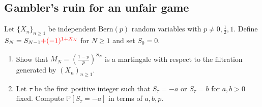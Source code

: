 \documentclass[12pt,reqno]{amsart}
\theoremstyle{definition}
\theoremstyle{remark}
\numberwithin{equation}{section}
\begin{document}
\subsection{Gambler's ruin for an unfair game}\label{subsection:gambler}
Let $\{X_{n}\}_{n\geq1}$ be independent $\mathrm{Bern}(p)$ random variables with $p\neq0,\frac12,1$. Define $S_{N}=S_{N-1}{\color{red}+(-1)^{1+X_{N}}}$ for $N\geq1$ and set $S_{0}=0$. 
\begin{enumerate}
\item Show that $M_{N}=\left(\frac{1-p}{p}\right)^{S_{N}}$ is a martingale with respect to the filtration generated by $(X_{n})_{n\geq1}$.
\item Let $\tau$ be the first positive integer such that $S_{\tau}=-a$ or $S_{\tau}=b$ for $a,b>0$ fixed. Compute $\mathbb{P}[S_{\tau}=-a]$ in terms of $a,b,p$.
\end{enumerate}
\begin{comment}
\subsection{Trigonometry is very important for studying stochastic processes}
Keep the notation of Problem \ref{subsection:gambler}, but suppose now that $p=\frac12$. 
\begin{enumerate}
\item Define $Y_{N}=\frac{\cos\left[\lambda\left(S_{N}-\frac{b-a}{2}\right)\right]}{(\cos\lambda)^{N}}$, where $a,b>0$ (suppose that $\cos\lambda\neq0$). Show that $Y_{N}$ is a martingale with respect to the filtration generated by $(X_{n})_{n\geq1}$.
\item Let $\tau$ be the first time that $S_{\tau}=-	1$ or $S_{\tau}=1$. Show that 
%
\begin{align*}
\E\left[\frac{\cos[\lambda S_{\tau}]}{(\cos\lambda)^{\tau}}\right]=1.
\end{align*}
%
(\emph{Remember to check conditions of any theorem you may want use to make sure it applies!})
\item Deduce that $\E[(\cos\lambda)^{-\tau}]=(\cos\lambda)^{-1}$.
\end{enumerate}
\end{comment}
\end{document}
